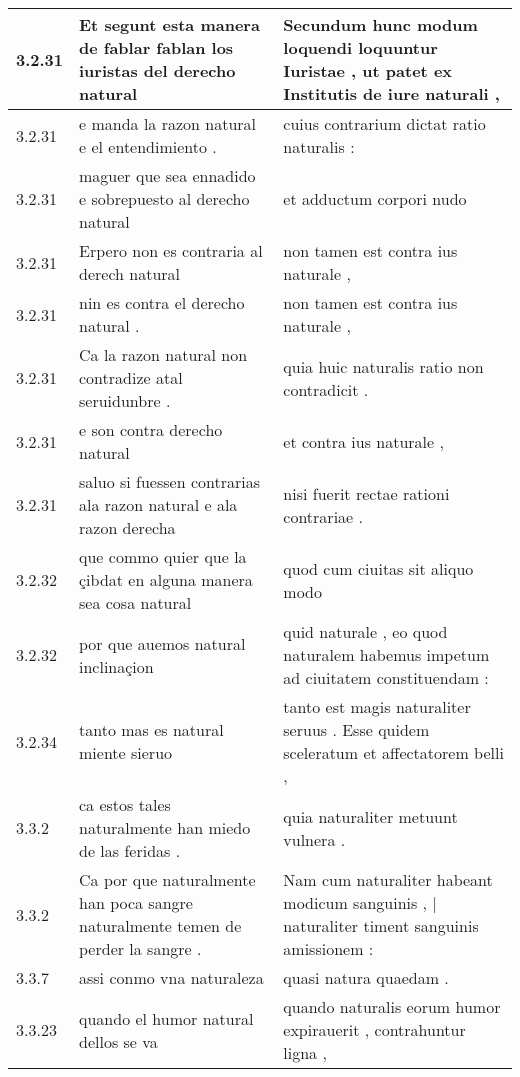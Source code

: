 \begin{tabular}{|p{1cm}|p{6.5cm}|p{6.5cm}|}
3.2.31 & Et segunt esta manera de fablar fablan los iuristas del derecho natural & Secundum hunc modum loquendi loquuntur Iuristae , ut patet ex Institutis de iure naturali , \\\hline
3.2.31 & e manda la razon natural e el entendimiento . & cuius contrarium dictat ratio naturalis : \\\hline
3.2.31 & maguer que sea ennadido e sobrepuesto al derecho natural & et adductum corpori nudo \\\hline
3.2.31 & Erpero non es contraria al derech natural & non tamen est contra ius naturale , \\\hline
3.2.31 & nin es contra el derecho natural . & non tamen est contra ius naturale , \\\hline
3.2.31 & Ca la razon natural non contradize atal seruidunbre . & quia huic naturalis ratio non contradicit . \\\hline
3.2.31 & e son contra derecho natural & et contra ius naturale , \\\hline
3.2.31 & saluo si fuessen contrarias ala razon natural e ala razon derecha & nisi fuerit rectae rationi contrariae . \\\hline
3.2.32 & que commo quier que la çibdat en alguna manera sea cosa natural & quod cum ciuitas sit aliquo modo \\\hline
3.2.32 & por que auemos natural inclinaçion & quid naturale , eo quod naturalem habemus impetum ad ciuitatem constituendam : \\\hline
3.2.34 & tanto mas es natural miente sieruo & tanto est magis naturaliter seruus . Esse quidem sceleratum et affectatorem belli , \\\hline
3.3.2 & ca estos tales naturalmente han miedo de las feridas . & quia naturaliter metuunt vulnera . \\\hline
3.3.2 & Ca por que naturalmente han poca sangre naturalmente temen de perder la sangre . & Nam cum naturaliter habeant modicum sanguinis , | naturaliter timent sanguinis amissionem : \\\hline
3.3.7 & assi conmo vna naturaleza & quasi natura quaedam . \\\hline
3.3.23 & quando el humor natural dellos se va & quando naturalis eorum humor expirauerit , contrahuntur ligna , \\\hline

\end{tabular}
